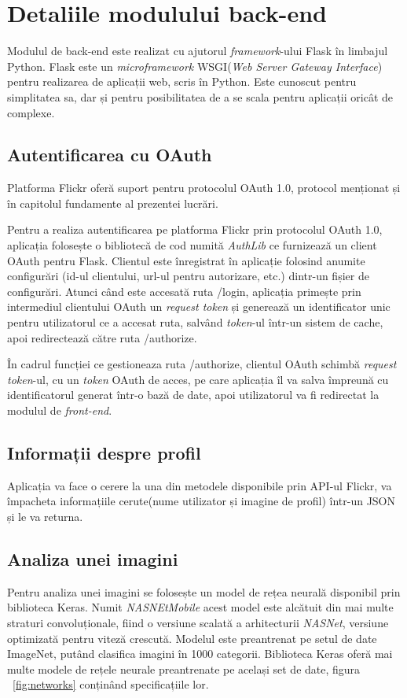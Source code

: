 \section{Detaliile modulului back-end}
Modulul de back-end este realizat cu ajutorul \textit{framework}-ului Flask în limbajul Python. Flask este un \textit{microframework} WSGI(\textit{Web Server Gateway Interface})\cite{pep-3333} pentru realizarea de aplicații web, scris în Python. Este cunoscut pentru simplitatea sa, dar și pentru posibilitatea de a se scala pentru aplicații oricât de complexe.


\subsection{Autentificarea cu OAuth}
Platforma Flickr oferă suport pentru protocolul OAuth 1.0, protocol menționat și în capitolul fundamente al prezentei lucrări.

Pentru a realiza autentificarea pe platforma Flickr prin protocolul OAuth 1.0, aplicația folosește o bibliotecă de cod numită \textit{AuthLib} ce furnizează un client OAuth pentru Flask. Clientul este înregistrat în aplicație folosind anumite configurări (id-ul clientului, url-ul pentru autorizare, etc.) dintr-un fișier de configurări. Atunci când este accesată ruta /login, aplicația primește prin intermediul clientului OAuth un \textit{request token} și generează un identificator unic pentru utilizatorul ce a accesat ruta, salvând \textit{token}-ul într-un sistem de cache, apoi redirectează către ruta /authorize.

În cadrul funcției ce gestioneaza ruta /authorize, clientul OAuth schimbă \textit{request token}-ul, cu un \textit{token} OAuth de acces, pe care aplicația îl va salva împreună cu identificatorul generat într-o bază de date, apoi utilizatorul va fi redirectat la modulul de \textit{front-end}.

\subsection{Informații despre profil}
Aplicația va face o cerere la una din metodele disponibile prin API-ul Flickr, va împacheta informațiile cerute(nume utilizator și imagine de profil) într-un JSON și le va returna.

\subsection{Analiza unei imagini}
Pentru analiza unei imagini se folosește un model de rețea neurală disponibil prin biblioteca Keras. Numit \textit{NASNEtMobile} acest model este alcătuit din mai multe straturi convoluționale, fiind o versiune scalată a arhitecturii \textit{NASNet}, versiune optimizată pentru viteză crescută. Modelul este preantrenat pe setul de date ImageNet, putând clasifica imagini în 1000 categorii.
Biblioteca Keras oferă mai multe modele de rețele neurale preantrenate pe același set de date, figura ~\ref{fig:networks} conținând specificațiile lor.

